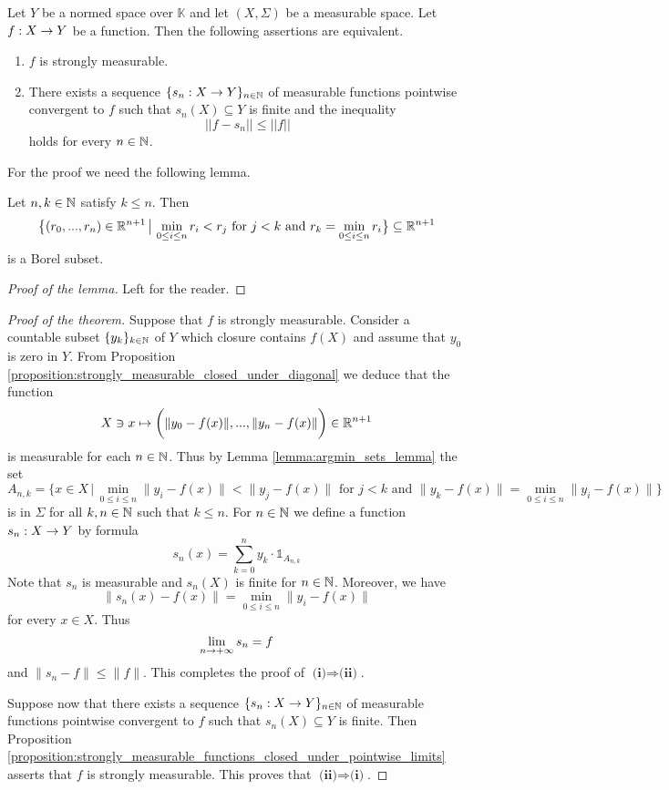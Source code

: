 \documentclass[10pt]{amsart}
\begin{document}
\begin{theorem}\label{theorem:simple_approximation_strongly_measurable}
	Let $Y$ be a normed space over $\mathbb{K}$ and let $(X,\Sigma)$ be a measurable space. Let $f:X\rightarrow Y$ be a function. Then the following assertions are equivalent.
	\begin{enumerate}[label=\emph{\textbf{(\roman*)}}, leftmargin=*]
		\item $f$ is strongly measurable.
		\item There exists a sequence $\{s_n:X\rightarrow Y\}_{n\in {\mathbb N}}$ of measurable functions pointwise convergent to $f$ such that $s_n(X)\subseteq Y$ is finite and the inequality
		      $$||f - s_n||\leq ||f||$$
		      holds for every $n\in {\mathbb N}$.
	\end{enumerate}
\end{theorem}
\noindent
For the proof we need the following lemma.

\begin{lemma}\label{lemma:argmin_sets_lemma}
	Let $n,k\in {\mathbb N}$ satisfy $k \leq n$. Then
	$$\big\{(r_0,...,r_n)\in {\mathbb R}^{n+1}\,\big|\,\min_{0\leq i\leq n} r_i < r_j\mbox{ for }j < k\mbox{ and }r_k = \min_{0\leq i\leq n} r_i\big\} \subseteq {\mathbb R}^{n+1}$$
	is a Borel subset.
\end{lemma}
\begin{proof}[Proof of the lemma]
	Left for the reader.
\end{proof}

\begin{proof}[Proof of the theorem]
	Suppose that $f$ is strongly measurable. Consider a countable subset $\{y_k\}_{k\in {\mathbb N}}$ of $Y$ which closure contains $f(X)$ and assume that $y_0$ is zero in $Y$. From Proposition \ref{proposition:strongly_measurable_closed_under_diagonal} we deduce that the function
	$$X\ni x\mapsto \bigg(\lVert y_0 - f(x)\rVert,...,\lVert y_n - f(x)\rVert \bigg)\in {\mathbb R}^{n+1}$$
	is measurable for each $n \in {\mathbb N}$. Thus by Lemma \ref{lemma:argmin_sets_lemma} the set
	$$A_{n,k} = \big\{x \in X\,\big|\,\min_{0\leq i\leq n}\lVert y_i - f(x)\rVert < \lVert y_j - f(x)\rVert \mbox{ for }j < k\mbox{ and }\lVert y_k - f(x)\rVert = \min_{0\leq i\leq n}\lVert y_i - f(x)\rVert\big\}$$
	is in $\Sigma$ for all $k,n\in {\mathbb N}$ such that $k \leq n$. For $n\in {\mathbb N}$ we define a function $s_n:X\rightarrow Y$ by formula
	$$s_n(x) = \sum_{k=0}^ny_k\cdot \mathbb{1}_{A_{n,k}}$$
	Note that $s_n$ is measurable and $s_n(X)$ is finite for $n\in {\mathbb N}$. Moreover, we have
	$$\lVert s_n(x) - f(x)\rVert = \min_{0\leq i\leq n}\lVert y_i - f(x)\rVert$$
	for every $x \in X$. Thus
	$$\lim_{n\rightarrow +\infty}s_n = f$$
	and $\lVert s_n - f\rVert \leq  \lVert f\rVert$. This completes the proof of $\textbf{(i)}\Rightarrow \textbf{(ii)}$.

	Suppose now that there exists a sequence $\{s_n:X\rightarrow Y\}_{n\in {\mathbb N}}$ of measurable functions pointwise convergent to $f$ such that $s_n(X)\subseteq Y$ is finite. Then Proposition \ref{proposition:strongly_measurable_functions_closed_under_pointwise_limits} asserts that $f$ is strongly measurable. This proves that $\textbf{(ii)}\Rightarrow \textbf{(i)}$.
\end{proof}
\end{document}
